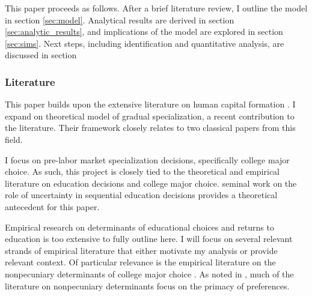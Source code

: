 


This paper proceeds as follows. After a brief literature review, I outline the model in section \ref{sec:model}. Analytical results are derived in section \ref{sec:analytic_results}, and implications of the model are explored in section \ref{sec:sims}. Next steps, including identification and quantitative analysis, are discussed in section 

\subsubsection*{Literature}

This paper builds upon the extensive literature on human capital formation \parencite{B62,B67,M74,R83}. 
I expand on  theoretical model of gradual specialization, a recent contribution to the literature. 
Their framework closely relates to two classical papers from this field.

I focus on pre-labor market specialization decisions, specifically college major choice. 
As such, this project is closely tied to the theoretical and empirical literature on education decisions and college major choice.
 seminal work on the role of uncertainty in sequential education decisions provides a theoretical antecedent for this paper. 

Empirical research on determinants of educational choices and returns to education is too extensive to fully outline here.
I will focus on several relevant strands of empirical literature that either motivate my analysis or provide relevant context. 
Of particular relevance is the empirical literature on the nonpecuniary determinants of college major choice \parencite{A04,WZ18,Z13}.
As noted in , much of the literature on nonpecuniary determinants focus on the primacy of preferences. 


